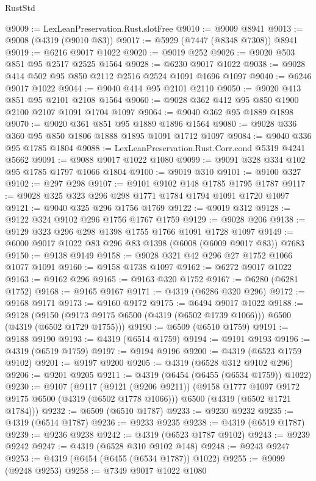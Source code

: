 \begin{lexlean}{RustStd}
\begin{coremodule}
@9009 := LexLeanPreservation.Rust.slotFree
@9010 := @9009 @8941
@9013 := @9008 (@4319 (@9010 @83))
@9017 := @5929 (@7447 (@8348 @7308)) @8941
@9019 := @6216 @9017 @1022
@9020 := @9019 @252
@9026 := @9020 @503 @851 @95 @2517 @2525 @1564
@9028 := @6230 @9017 @1022
@9038 := @9028 @414 @502 @95 @850 @2112 @2516 @2524 @1091 @1696 @1097
@9040 := @6246 @9017 @1022
@9044 := @9040 @414 @95 @2101 @2110
@9050 := @9020 @413 @851 @95 @2101 @2108 @1564
@9060 := @9028 @362 @412 @95 @850 @1900 @2100 @2107 @1091 @1704 @1097
@9064 := @9040 @362 @95 @1889 @1898
@9070 := @9020 @361 @851 @95 @1889 @1896 @1564
@9080 := @9028 @336 @360 @95 @850 @1806 @1888 @1895 @1091 @1712 @1097
@9084 := @9040 @336 @95 @1785 @1804
@9088 := LexLeanPreservation.Rust.Corr.cond @5319 @4241 @5662
@9091 := @9088 @9017 @1022 @1080
@9099 := @9091 @328 @334 @102 @95 @1785 @1797 @1066 @1804
@9100 := @9019 @310
@9101 := @9100 @327
@9102 := @297 @298
@9107 := @9101 @9102 @148 @1785 @1795 @1787
@9117 := @9028 @325 @323 @296 @298 @1771 @1784 @1794 @1091 @1720 @1097
@9121 := @9040 @325 @296 @1756 @1769
@9122 := @9019 @312
@9128 := @9122 @324 @9102 @296 @1756 @1767 @1759
@9129 := @9028 @206
@9138 := @9129 @323 @296 @298 @1398 @1755 @1766 @1091 @1728 @1097
@9149 := @6000 @9017 @1022 @83 @296 @83 @1398 (@6008 (@6009 @9017 @83)) @7683
@9150 := @9138 @9149
@9158 := @9028 @321 @42 @296 @27 @1752 @1066 @1077 @1091
@9160 := @9158 @1738 @1097
@9162 := @6272 @9017 @1022
@9163 := @9162 @296
@9165 := @9163 @320 @1752
@9167 := @6280 (@6281 @1752)
@9168 := @9165 @9167
@9171 := @4319 (@6286 @320 @296)
@9172 := @9168 @9171
@9173 := @9160 @9172
@9175 := @6494 @9017 @1022
@9188 := @9128
    (@9150 (@9173 @9175 @6500 (@4319 (@6502 @1739 @1066))) @6500 (@4319 (@6502 @1729 @1755)))
@9190 := @6509 (@6510 @1759)
@9191 := @9188 @9190
@9193 := @4319 (@6514 @1759)
@9194 := @9191 @9193
@9196 := @4319 (@6519 @1759)
@9197 := @9194 @9196
@9200 := @4319 (@6523 @1759 @9102)
@9201 := @9197 @9200
@9205 := @4319 (@6528 @312 @9102 @296)
@9206 := @9201 @9205
@9211 := @4319 (@6454 (@6455 (@6534 @1759)) @1022)
@9230 := @9107
    (@9117
      (@9121 (@9206 @9211))
      (@9158 @1777 @1097 @9172 @9175 @6500 (@4319 (@6502 @1778 @1066)))
      @6500
      (@4319 (@6502 @1721 @1784)))
@9232 := @6509 (@6510 @1787)
@9233 := @9230 @9232
@9235 := @4319 (@6514 @1787)
@9236 := @9233 @9235
@9238 := @4319 (@6519 @1787)
@9239 := @9236 @9238
@9242 := @4319 (@6523 @1787 @9102)
@9243 := @9239 @9242
@9247 := @4319 (@6528 @310 @9102 @148)
@9248 := @9243 @9247
@9253 := @4319 (@6454 (@6455 (@6534 @1787)) @1022)
@9255 := @9099 (@9248 @9253)
@9258 := @7349 @9017 @1022 @1080

\end{coremodule}
\end{lexlean}

